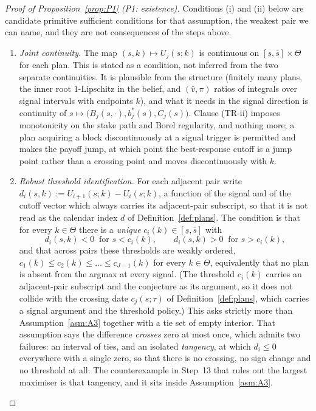 \documentclass[11pt]{article}
\begin{document}
\begin{proof}[Proof of Proposition~\ref{prop:P1} (P1: existence)]
Conditions (i) and (ii) below are candidate primitive sufficient conditions for that assumption, the
weakest pair we can name, and they are not consequences of the steps above.

\begin{enumerate}[label=(\roman*),leftmargin=2.4em,itemsep=3pt]
\item \emph{Joint continuity.} The map $(s,k) \mapsto U_j(s;k)$ is continuous on
  $[\underline s,\overline s] \times \Theta$ for each plan. This is stated as a condition, not
  inferred from the two separate continuities. It is plausible from the structure (finitely many
  plans, the inner root $1$-Lipschitz in the belief, and $(\hat v,\pi)$ ratios of integrals over
  signal intervals with endpoints $k$), and what it needs in the signal direction is continuity of
  $s \mapsto \bigl(B_j(s,\cdot),b_j^*(s),C_j(s)\bigr)$. Clause (TR-ii) imposes monotonicity on the
  stake path and Borel regularity, and nothing more; a plan acquiring a block discontinuously at a
  signal trigger is permitted and makes the payoff jump, at which point the best-response cutoff is a
  jump point rather than a crossing point and moves discontinuously with $k$.
\item \emph{Robust threshold identification.} For each adjacent pair write
  $d_i(s,k) := U_{i+1}(s;k)-U_i(s;k)$, a function of the signal and of the cutoff vector which always
  carries its adjacent-pair subscript, so that it is not read as the calendar index $d$ of
  Definition~\ref{def:plans}. The condition is that for every $k \in \Theta$ there is a \emph{unique}
  $c_i(k) \in [\underline s,\overline s]$ with
  \[
  d_i(s,k) < 0 \ \text{ for } s < c_i(k),
  \qquad
  d_i(s,k) > 0 \ \text{ for } s > c_i(k),
  \]
  and that across pairs these thresholds are weakly ordered,
  $c_1(k) \le c_2(k) \le \dots \le c_{J-1}(k)$ for every $k \in \Theta$, equivalently that no plan is
  absent from the argmax at every signal. (The threshold $c_i(k)$ carries an adjacent-pair subscript
  and the conjecture as its argument, so it does not collide with the crossing date $c_j(s;\tau)$ of
  Definition~\ref{def:plans}, which carries a signal argument and the threshold policy.) This asks
  strictly more than Assumption~\ref{asm:A3} together with a tie set of empty interior. That
  assumption says the difference \emph{crosses} zero at most once, which admits two failures: an
  interval of ties, and an isolated \emph{tangency}, at which $d_i \le 0$ everywhere with a single
  zero, so that there is no crossing, no sign change and no threshold at all. The counterexample in
  Step~13 that rules out the largest maximiser is that tangency, and it sits inside
  Assumption~\ref{asm:A3}.
\end{enumerate}


\end{proof}
\end{document}

